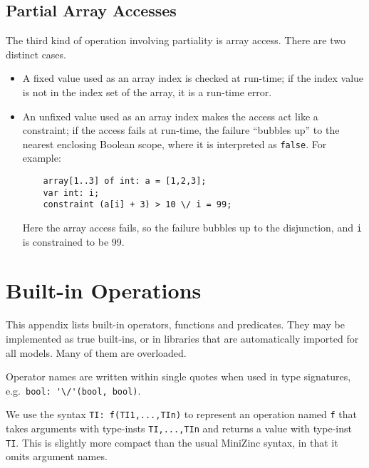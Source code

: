 \documentclass[10pt]{scrartcl}
\begin{document}
\subsection{Partial Array Accesses}
The third kind of operation involving partiality is array access.  There
are two distinct cases.
\begin{itemize}
\item
    A fixed value used as an array index is checked at run-time;  if the
    index value is not in the index set of the array, it is a run-time
    error.
\item
    An unfixed value used as an array index makes the access act like a
    constraint;  if the access fails at run-time, the failure ``bubbles up''
    to the nearest enclosing Boolean scope, where it is interpreted as
    \texttt{false}.  For example:
\begin{verbatim}
    array[1..3] of int: a = [1,2,3];
    var int: i;
    constraint (a[i] + 3) > 10 \/ i = 99;
\end{verbatim}
    Here the array access fails, so the failure bubbles up to the
    disjunction, and \texttt{i} is constrained to be 99.
\end{itemize}

\appendix
\clearpage
\section{Built-in Operations}
  \label{builtins}
This appendix lists built-in operators, functions and
predicates.  They may be implemented as true built-ins, or in libraries that
are automatically imported for all models.  Many of them are overloaded.

Operator names are written within single quotes when used in type
signatures, e.g.~\verb+bool: '\/'(bool, bool)+.

We use the syntax \texttt{TI: f(TI1,...,TIn)} to represent an operation
named \texttt{f} that takes arguments with type-insts \texttt{TI,...,TIn}
and returns a value with type-inst \texttt{TI}.  This is slightly more
compact than the usual MiniZinc syntax, in that it omits argument names.
\end{document}
